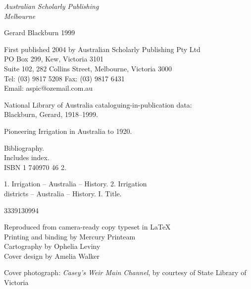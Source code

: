 \documentclass[11pt,b5paper,titlepage]{book}
\newcommand{\clearemptydoublepage}{\newpage{\pagestyle{empty}\cleardoublepage}}
\begin{document}
\begin{titlepage}
\begin{center}
\vspace*{\fill}
{\sffamily\slshape\Large Australian Scholarly Publishing\\Melbourne}
\end{center}
\newpage


\begin{raggedright}

\vspace*{15ex}

 Gerard Blackburn 1999

\bigskip
First published 2004 by Australian Scholarly Publishing Pty Ltd\\
PO Box 299, Kew, Victoria 3101\\
Suite 102, 282 Collins Street, Melbourne, Victoria 3000\\
Tel: (03) 9817 5208 \quad Fax: (03) 9817 6431\\
Email: aspic@ozemail.com.au


\bigskip
National Library of Australia cataloguing-in-publication data:\\

\medskip
Blackburn, Gerard, 1918--1999.
\begin{list}{}{\setlength{\topsep}{0ex}\setlength{\itemsep}{0ex}\setlength{\leftmargin}{2.5ex}}
\item
Pioneering Irrigation in Australia to 1920.
\item
Bibliography.\\
Includes index.\\
ISBN 1 740970 46 2.
\item
1. Irrigation -- Australia -- History. 2. Irrigation\\
districts -- Australia -- History. I. Title.
\end{list}
3339130994

\bigskip
Reproduced from camera-ready copy typeset in \LaTeX\\
Printing and binding by Mercury Printeam\\
Cartography by Ophelia Leviny\\
Cover design by Amelia Walker

\bigskip
Cover photograph:
\textit{Casey's Weir Main Channel}, 
by courtesy of
State Library of Victoria

\end{raggedright}
\clearemptydoublepage

\end{titlepage}
\end{document}
